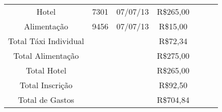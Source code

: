 \documentclass{article}
\begin{document}
\begin{table}[htbp!]
{\begin{tabular}{|c|c|c|c|c|c|}
    Hotel                 & 7301   & 07/07/13 & R\$265,00            & ~                                & ~                   \\
    Alimentação           & 9456   & 07/07/13 & R\$15,00             & ~                                & ~                   \\
\hline
    Total Táxi Individual & ~      & ~        & R\$72,34             & ~                                & ~                   \\
    Total Alimentação     & ~      & ~        & R\$275,00            & ~                                & ~                   \\
    Total Hotel           & ~      & ~        & R\$265,00            & ~                                & ~                   \\
    Total Inscrição       & ~      & ~        & R\$92,50             & ~                                & ~                   \\
\hline
    Total de Gastos       & ~      & ~        & R\$704,84            & ~                                & ~                   \\
\hline

    \end{tabular}
}
\end{table}

%
%
\end{document}
